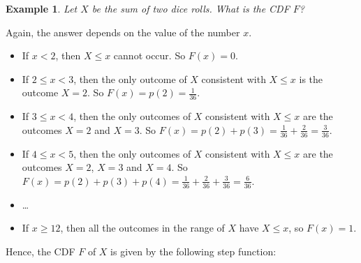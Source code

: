 \documentclass[
  a4paper,
]{book}
\theoremstyle{definition}
\theoremstyle{definition}
\newtheorem{example}{Example}[chapter]
\theoremstyle{definition}
\theoremstyle{definition}
\theoremstyle{remark}
\begin{document}
\begin{example}
\emph{Let \(X\) be the sum of two dice rolls. What is the CDF \(F\)?}

Again, the answer depends on the value of the number \(x\).

\begin{itemize}
\item
  If \(x < 2\), then \(X \leq x\) cannot occur. So \(F(x) = 0\).
\item
  If \(2 \leq x < 3\), then the only outcome of \(X\) consistent with \(X \leq x\) is the outcome \(X = 2\). So \(F(x) = p(2) = \frac{1}{36}\).
\item
  If \(3 \leq x < 4\), then the only outcomes of \(X\) consistent with \(X \leq x\) are the outcomes \(X = 2\) and \(X = 3\). So \(F(x) = p(2) + p(3) = \frac{1}{36} + \frac{2}{36} = \frac{3}{36}\).
\item
  If \(4 \leq x < 5\), then the only outcomes of \(X\) consistent with \(X \leq x\) are the outcomes \(X = 2\), \(X = 3\) and \(X = 4\). So \(F(x) = p(2) + p(3) + p(4) = \frac{1}{36} + \frac{2}{36} + \frac{3}{36}= \frac{6}{36}\).
\item
  \ldots{}
\item
  If \(x \geq 12\), then all the outcomes in the range of \(X\) have \(X \leq x\), so \(F(x) = 1\).
\end{itemize}

Hence, the CDF \(F\) of \(X\) is given by the following step function:


\end{example}
\end{document}
